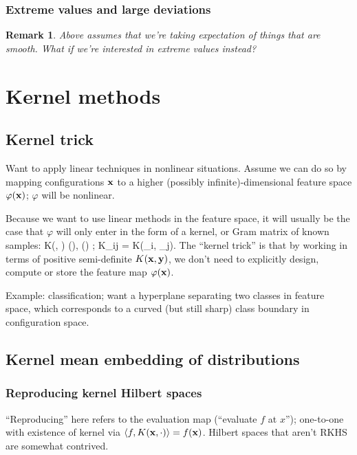 \documentclass[notitlepage,openany,11pt]{report}
\theoremstyle{plain}%
\newtheorem{notethm}{Remark}
\newenvironment{notebox}
    {\noindent\colorlet{shadecolor}{cyan!15}\begin{shaded}\begin{notethm}}
    {\end{notethm}\end{shaded}}
\numberwithin{equation}{section}
\begin{document}
\subsubsection{Extreme values and large deviations} 
\begin{notebox}
Above assumes that we're taking expectation of things that are smooth. What if we're interested in extreme values instead?
\end{notebox}
[...]


\section{Kernel methods}

\subsection{Kernel trick}

Want to apply linear techniques in nonlinear situations. Assume we can do so by mapping configurations $\mathbf{x}$ to a higher (possibly infinite)-dimensional feature space $\varphi(\mathbf{x})$; $\varphi$ will be nonlinear.

Because we want to use linear methods in the feature space, it will usually be the case that $\varphi$ will only enter in the form of a kernel, or Gram matrix of known samples:
\be
K(, ) \equiv \langle \varphi(), \varphi() \rangle; \qquad K_{ij} = K(_{i}, _{j}).
\ee
The ``kernel trick'' is that by working in terms of positive semi-definite $K(\mathbf{x}, \mathbf{y})$, we don't need to explicitly design, compute or store the feature map $\varphi(\mathbf{x})$. 

Example: classification; want a hyperplane separating two classes in feature space, which corresponds to a curved (but still sharp) class boundary in configuration space.




\subsection{Kernel mean embedding of distributions}

\subsubsection{Reproducing kernel Hilbert spaces}

``Reproducing'' here refers to the evaluation map (``evaluate $f$ at $x$''); one-to-one with existence of kernel via $\langle f, K(\mathbf{x}, \cdot) \rangle = f(\mathbf{x})$. Hilbert spaces that aren't RKHS are somewhat contrived.
\end{document}
